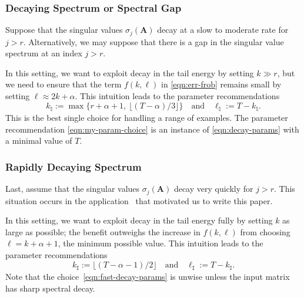 \documentclass[final]{siamart1116}
\numberwithin{equation}{section}
\numberwithin{theorem}{section}
\numberwithin{figure}{section}
\newcommand{\mtx}[1]{\bm{#1}}
\begin{document}
\subsubsection{Decaying Spectrum or Spectral Gap}

Suppose that the singular values $\sigma_j(\mtx{A})$ decay
at a slow to moderate rate for $j > r$.
Alternatively, we may suppose that there is a
gap in the singular value spectrum at an index $j > r$.

In this setting, we want to exploit decay in the tail energy by setting $k \gg r$,
but we need to ensure that the term $f(k, \ell)$ in \cref{eqn:err-frob}
remains small by setting $\ell \approx 2k + \alpha$.
This intuition leads to the parameter recommendations
\begin{equation} \label{eqn:decay-params}
k_{\natural} := \max\{ r + \alpha + 1, \ \lfloor (T-\alpha)/3 \rfloor \}
\quad\text{and}\quad
\ell_{\natural} := T - k_{\natural}.
\end{equation} This is the best single choice for handling a range of examples.
The parameter recommendation \cref{eqn:my-param-choice} is an
instance of \cref{eqn:decay-params} with a minimal value of $T$.


\subsubsection{Rapidly Decaying Spectrum}

Last, assume that the singular values $\sigma_j(\mtx{A})$
decay very quickly for $j > r$. This situation occurs in the application~\cite{YUTC16:Sketchy-Decisions}
that motivated us to write this paper.

In this setting, we want to exploit decay in the tail energy
fully by setting $k$ as large as possible;
the benefit outweighs the increase in $f(k, \ell)$
from choosing $\ell = k + \alpha + 1$, the minimum possible value.
This intuition leads to the parameter recommendations
\begin{equation} \label{eqn:fast-decay-params}
k_{\sharp} := \lfloor (T-\alpha-1)/2 \rfloor
\quad\text{and}\quad
\ell_{\sharp} := T - k_{\sharp}.
\end{equation} Note that the choice~\eqref{eqn:fast-decay-params} is unwise unless the input matrix has sharp spectral decay.
\end{document}
